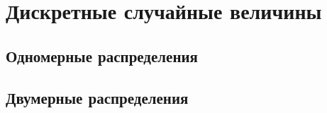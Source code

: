 

\section{Дискретные случайные величины}

\subsection{Одномерные распределения}

\subsection{Двумерные распределения}

